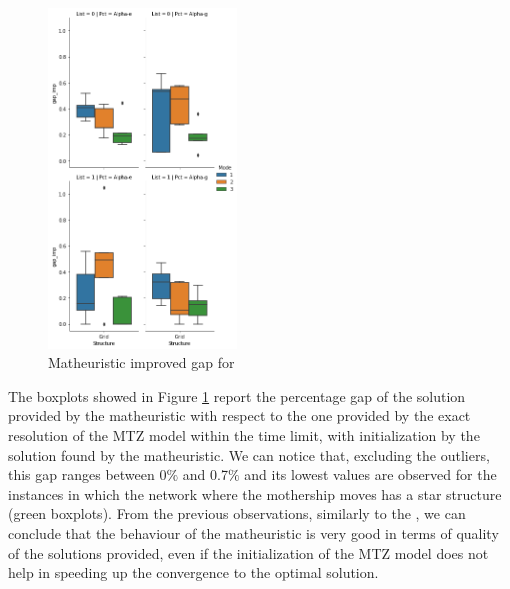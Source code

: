 \begin{figure}
\centering
\includegraphics[width=5cm]{improved_gap_ND.png}
\caption{Matheuristic improved gap for \NMD}
\label{fig:4}
\end{figure}
\noindent
The boxplots showed in Figure \ref{fig:4} report the percentage gap of the solution provided by the matheuristic with respect to the one provided by the exact resolution of the MTZ model within the time limit, with initialization by the solution found by the matheuristic.
We can notice that, excluding the outliers, this gap ranges between 0$\%$ and 0.7$\%$ and its lowest values are observed for the instances in which the network where the mothership moves has a star structure (green boxplots). 
From the previous observations, similarly to the \AMD, we can conclude that the behaviour of the matheuristic is very good in terms of quality of the solutions provided, even if the initialization of the MTZ model does not help in speeding up the convergence to the optimal solution. 



